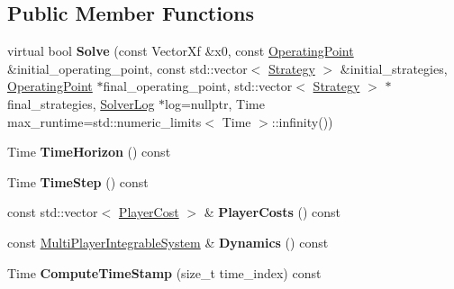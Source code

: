 \subsection*{Public Member Functions}
\begin{DoxyCompactItemize}
\item 
virtual bool {\bfseries Solve} (const Vector\+Xf \&x0, const \hyperlink{structilqgames_1_1_operating_point}{Operating\+Point} \&initial\+\_\+operating\+\_\+point, const std\+::vector$<$ \hyperlink{structilqgames_1_1_strategy}{Strategy} $>$ \&initial\+\_\+strategies, \hyperlink{structilqgames_1_1_operating_point}{Operating\+Point} $\ast$final\+\_\+operating\+\_\+point, std\+::vector$<$ \hyperlink{structilqgames_1_1_strategy}{Strategy} $>$ $\ast$final\+\_\+strategies, \hyperlink{classilqgames_1_1_solver_log}{Solver\+Log} $\ast$log=nullptr, Time max\+\_\+runtime=std\+::numeric\+\_\+limits$<$ Time $>$\+::infinity())\hypertarget{classilqgames_1_1_game_solver_a24ed8caa4c9217122f7ce86f16d1bd34}{}\label{classilqgames_1_1_game_solver_a24ed8caa4c9217122f7ce86f16d1bd34}

\item 
Time {\bfseries Time\+Horizon} () const \hypertarget{classilqgames_1_1_game_solver_a9fa5328990bd8139c556c09453020e33}{}\label{classilqgames_1_1_game_solver_a9fa5328990bd8139c556c09453020e33}

\item 
Time {\bfseries Time\+Step} () const \hypertarget{classilqgames_1_1_game_solver_a113252da6aa43d0beb9966277653af04}{}\label{classilqgames_1_1_game_solver_a113252da6aa43d0beb9966277653af04}

\item 
const std\+::vector$<$ \hyperlink{classilqgames_1_1_player_cost}{Player\+Cost} $>$ \& {\bfseries Player\+Costs} () const \hypertarget{classilqgames_1_1_game_solver_afe05eb1238b481b82747f9edf005c301}{}\label{classilqgames_1_1_game_solver_afe05eb1238b481b82747f9edf005c301}

\item 
const \hyperlink{classilqgames_1_1_multi_player_integrable_system}{Multi\+Player\+Integrable\+System} \& {\bfseries Dynamics} () const \hypertarget{classilqgames_1_1_game_solver_aa0917153345988be1661fca76a6f8500}{}\label{classilqgames_1_1_game_solver_aa0917153345988be1661fca76a6f8500}

\item 
Time {\bfseries Compute\+Time\+Stamp} (size\+\_\+t time\+\_\+index) const \hypertarget{classilqgames_1_1_game_solver_a490b20711d5d698171620f5bce607027}{}\label{classilqgames_1_1_game_solver_a490b20711d5d698171620f5bce607027}

\end{DoxyCompactItemize}
